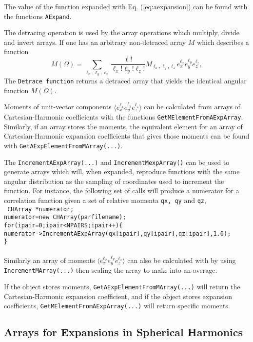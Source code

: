 \documentclass[10pt]{article}
\def\tab{\hspace*{9pt}}
\begin{document}
The value of the function expanded with Eq. (\ref{eq:aexpansion}) can be found with the functions {\tt AExpand}. 

The detracing operation is used by the array operations which multiply, divide and invert arrays. If one has an arbitrary non-detraced array $M$ which describes a function
\begin{equation}
M(\Omega)=\sum_{\ell_x,\ell_y,\ell_z}\frac{\ell!}{\ell_x!\ell_y!\ell_z!}
M_{\ell_x,\ell_y,\ell_z} e_x^{\ell_x}e_y^{\ell_y}e_z^{\ell_z},
\end{equation}
The {\tt Detrace function} returns a detraced array that yields the identical angular function $M(\Omega)$.

Moments of unit-vector components $\langle e_x^{\ell_x}e_y^{\ell_y}e_z^{\ell_z}\rangle$ can be calculated from arrays of Cartesian-Harmonic coefficients with the functions {\tt GetMElementFromAExpArray}. Similarly, if an array stores the moments, the equivalent element for an array of Cartesian-Harmonic expansion coefficients that gives those moments can be found with {\tt GetAExpElementFromMArray(...)}. 

The {\tt IncrementAExpArray(...)} and {\tt IncrementMexpArray()} can be used to generate arrays which will, when expanded, reproduce functions with the same angular distribution as the sampling of coordinates used to increment the function. For instance, the following set of calls will produce a numerator for a correlation function given a set of relative momenta {\tt qx, qy} and {\tt qz},\\
{\tt
\tab CHArray *numerator;\\
\tab numerator=new CHArray(parfilename);\\
\tab for(ipair=0;ipair<NPAIRS;ipair++)\{\\
\tab \tab numerator->IncrementAExpArray(qx[ipair],qy[ipair],qz[ipair],1.0);\\
\tab \}\\
}\\
Similarly an array of moments $\langle e_x^{\ell_x}e_y^{\ell_y}e_z^{\ell_z}\rangle$ can also be calculated with by using {\tt IncrementMArray(...)} then scaling the array to make into an average.

If the object stores moments, {\tt GetAExpElementFromMArray(...)} will return the Cartesian-Harmonic expansion coefficient, and if the object stores expansion coefficients, {\tt GetMElementFromAExpArray(...)} will return specific moments.

\subsection{Arrays for Expansions in Spherical Harmonics}
\end{document}
